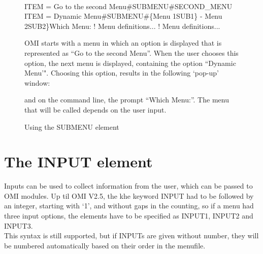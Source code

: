 \documentclass[a4paper]{book}
\newcommand{\gt}{\texttt{>}}
\renewcommand{\indent}{\hspace*{5mm}}
\begin{document}
\begin{figure}[h!tb]
\begin{minipage}[h!tb]{\textwidth}
\hrulefill \\
\begin{ttfamily}
 \newline
\indent ITEM = Go to the second Menu{\#}SUBMENU{\#}SECOND{\_}MENU \newline
  \newline
\indent ITEM = Dynamic Menu{\#}SUBMENU{\#}{\{}Menu 1\textbar SUB1{\}} - \newline
\indent\indent{\{}Menu 2\textbar SUB2{\}}Which Menu: \newline
  \newline
\indent ! Menu definitions... \newline
  \newline
\indent ! Menu definitions... \newline
\end{ttfamily}
\noindent OMI starts with a menu in which an option is displayed that is represented as 
``Go to the second Menu''. When the user chooses this option, the next menu is displayed, 
containing the option ``Dynamic Menu'". Choosing this option, results in the 
following `pop-up' window:

\hspace*{\fill}\fbox{\parbox{5em}{{\textbf{1\gt}} Menu 1 \newline {\textbf{2\gt}} Menu 2}}\hspace*{\fill}

\noindent and on the command line, the prompt ``Which Menu:''. The menu that will be called depends 
on the user input.\caption{Using the SUBMENU element}\label{fig:submenu}
\hrulefill
\end{minipage}
\end{figure}

\section{The INPUT element}
\label{subsec:mylabel5}

Inputs can be used to collect information from the user, which can be passed 
to OMI modules. Up til OMI V2.5, the khe keyword \textsf{INPUT} had to be followed by an integer, starting with `1', and without gaps in the counting, so if a menu had three input 
options, the elements have to be specified as \textsf{INPUT1}, \textsf{INPUT2} and \textsf{INPUT3}.\\
This syntax is still supported, but if \textsf{INPUT}s are given without number, they will be numbered automatically based on their order in the menufile.
\end{document}

